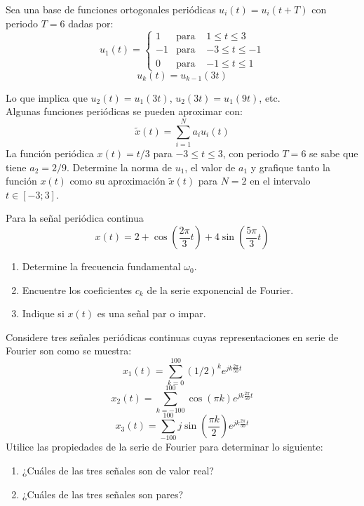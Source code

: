 \begin{ejercicio}
    Sea una base de funciones ortogonales periódicas $u_i(t)=u_i(t+T)$ con periodo $T=6$ dadas por:\\[3pt]
    $$
    u_1(t) = \left\{
        \begin{array}{lll}
            1  & \text{para } &1 \leq t \leq 3\\
            -1 & \text{para } &-3 \leq t \leq -1\\
            0  & \text{para } &-1 \leq t \leq 1
         \end{array}
        \right.
    $$\vspace{3pt}
    $$ u_k(t)=u_{k-1}(3t) $$

    Lo que implica que $u_2(t)=u_1(3t)$, $u_2(3t)=u_1(9t)$, etc.\\
    Algunas funciones periódicas se pueden aproximar con:
    $$ \tilde{x}(t)=\sum_{i=1}^{N}a_i u_i(t) $$
    La función periódica $x(t)=t/3$ para $-3 \leq t \leq 3$, con periodo $T=6$ se sabe que tiene $a_2=2/9$. Determine la norma de $u_1$, el valor de $a_1$ y grafique tanto la función $x(t)$ como su aproximación $\tilde{x}(t)$ para $N=2$ en el intervalo $t\in[-3;3]$.
\end{ejercicio}

\begin{ejercicio}
    Para la señal periódica continua
    $$ x(t) = 2+\cos{\left(\frac{2\pi}{3}t\right)}+4\sin\left(\frac{5\pi}{3}t\right) $$
    \begin{enumerate}
        \item Determine la frecuencia fundamental $\omega_0$.
        \item Encuentre los coeficientes $c_k$ de la serie exponencial de Fourier.
        \item Indique si $x(t)$ es una señal par o impar.
    \end{enumerate}
\end{ejercicio}

\begin{ejercicio}
    Considere tres señales periódicas continuas cuyas representaciones en serie de Fourier son como se muestra:
    $$ x_1(t) = \sum_{k=0}^{100} (1/2)^k e^{jk \frac{2\pi}{50}t} $$
    $$ x_2(t) = \sum_{k=-100}^{100} \cos(\pi k) e^{jk \frac{2\pi}{50}t} $$
    $$ x_3(t) = \sum_{-100}^{100} j\sin{\left(\frac{\pi k}{2} \right)} e^{jk \frac{2\pi}{50}t} $$
    Utilice las propiedades de la serie de Fourier para determinar lo siguiente:
    \begin{enumerate}
        \item ¿Cuáles de las tres señales son de valor real?
        \item ¿Cuáles de las tres señales son pares?
    \end{enumerate}
\end{ejercicio}

